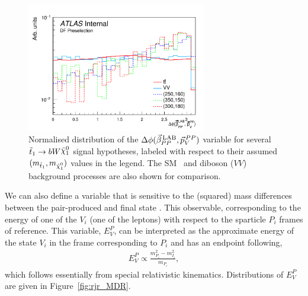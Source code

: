 \begin{figure}[!htb]
    \begin{center}
        \includegraphics[width=0.7\textwidth]{figures/search_stop2l/strategy/comp_plots/dfpresel_DPB_vSS}
        \caption{
            Normalised distribution of the $\Delta \phi (\vec{\beta}_{PP}^{\,\text{LAB}}, \vec{p}_V^{\,PP})$ variable for several $\stopone \rightarrow b W \ninoone$
            signal hypotheses, labeled with respect to their assumed $(m_{\stopone}, m_{\ninoone})$ values in the
            legend.
            The SM \ttbar~and diboson ($VV$) background processes are also shown for comparison.
        }
        \label{fig:rjr_DPB}
    \end{center}
\end{figure}

We can also define a variable that is sensitive to the (squared) mass differences between the pair-produced
\stopone and final state \ninoone.
This observable, corresponding to the energy of one of the $V_i$ (one of the leptons) with respect to the sparticle $P_i$ frames
of reference.
This variable, $E_V^P$, can be interpreted as the approximate energy of the state $V_i$ in the frame
corresponding to $P_i$ and has an endpoint following,
\begin{align}
    E_V^P \propto \frac{
        m_{P_i}^2 - m_{I_i}^2
    }
    {
        m_{P_i}
    },
    \label{eq:mdr_endpoint}
\end{align}
which follows essentially from special relativistic kinematics.
Distributions of $E_V^P$ are given in Figure~\ref{fig:rjr_MDR}.

